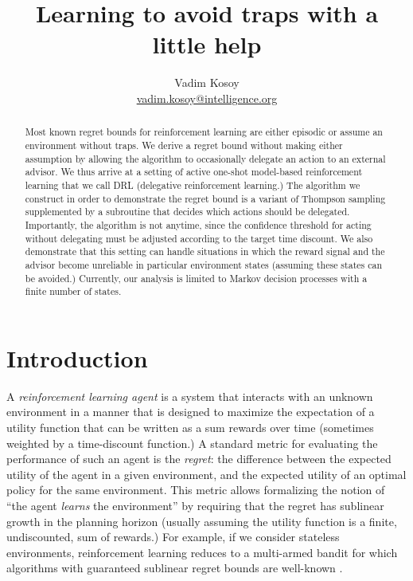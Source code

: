 \documentclass[11pt]{article}
\theoremstyle{definition}
\theoremstyle{plain}
\begin{document}
\title{Learning to avoid traps with a little help}
\author{Vadim Kosoy \\ \href{mailto:vadim.kosoy@intelligence.org}{vadim.kosoy@intelligence.org}}
\date{}
\maketitle

\begin{abstract}
    Most known regret bounds for reinforcement learning are either episodic or assume an environment without traps. We derive a regret bound without making either assumption by allowing the algorithm to occasionally delegate an action to an external advisor. We thus arrive at a setting of active one-shot model-based reinforcement learning that we call DRL (delegative reinforcement learning.) The algorithm we construct in order to demonstrate the regret bound is a variant of Thompson sampling supplemented by a subroutine that decides which actions should be delegated. Importantly, the algorithm is not anytime, since the confidence threshold for acting without delegating must be adjusted according to the target time discount. We also demonstrate that this setting can handle situations in which the reward signal and the advisor become unreliable in particular environment states (assuming these states can be avoided.) Currently, our analysis is limited to Markov decision processes with a finite number of states. 
\end{abstract}


\section{Introduction}

A \emph{reinforcement learning agent} is a system that interacts with an unknown environment in a manner that is designed to maximize the expectation of a utility function that can be written as a sum rewards over time (sometimes weighted by a time-discount function.) A standard metric for evaluating the performance of such an agent is the \emph{regret}: the difference between the expected utility of the agent in a given environment, and the expected utility of an optimal policy for the same environment. This metric allows formalizing the notion of \enquote{the agent \emph{learns} the environment} by requiring that the regret has sublinear growth in the planning horizon (usually assuming the utility function is a finite, undiscounted, sum of rewards.) For example, if we consider stateless environments, reinforcement learning reduces to a multi-armed bandit for which algorithms with guaranteed sublinear regret bounds are well-known \cite{TBD}.
\end{document}
